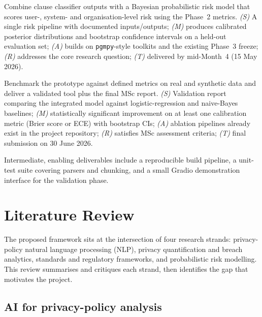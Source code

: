 \documentclass[12pt,a4paper,titlepage]{article}
\begin{document}
\begin{description}[leftmargin=1.6em,style=nextline]
    \item[\textbf{O4 -- Bayesian risk integration.}]
        Combine clause classifier outputs with a Bayesian probabilistic risk model that scores user-, system- and organisation-level risk using the Phase~2 metrics.
        \emph{(S)} A single risk pipeline with documented inputs/outputs; \emph{(M)} produces calibrated posterior distributions and bootstrap confidence intervals on a held-out evaluation set; \emph{(A)} builds on \texttt{pgmpy}-style toolkits and the existing Phase~3 freeze; \emph{(R)} addresses the core research question; \emph{(T)} delivered by mid-Month~4 (15 May 2026).

    \item[\textbf{O5 -- Validation, benchmarking and final report.}]
        Benchmark the prototype against defined metrics on real and synthetic data and deliver a validated tool plus the final MSc report.
        \emph{(S)} Validation report comparing the integrated model against logistic-regression and naive-Bayes baselines; \emph{(M)} statistically significant improvement on at least one calibration metric (Brier score or ECE) with bootstrap CIs; \emph{(A)} ablation pipelines already exist in the project repository; \emph{(R)} satisfies MSc assessment criteria; \emph{(T)} final submission on 30 June 2026.
\end{description}

Intermediate, enabling deliverables include a reproducible build pipeline, a unit-test suite covering parsers and chunking, and a small Gradio demonstration interface for the validation phase.

\section{Literature Review}\label{sec:litrev}

The proposed framework sits at the intersection of four research strands: privacy-policy natural language processing (NLP), privacy quantification and breach analytics, standards and regulatory frameworks, and probabilistic risk modelling. This review summarises and critiques each strand, then identifies the gap that motivates the project.

\subsection{AI for privacy-policy analysis}
\end{document}
